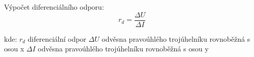   		Výpočet diferenciálního odporu:  		
  		\begin{equation}
  			r_d = \dfrac{\Delta U}{\Delta I}
  		\end{equation}
  		
  		\hspace*{2cm}kde:\newline    
			\hspace*{4cm}$r_d$ \dotfill diferenciální odpor\hspace*{4cm}\newline
			\hspace*{4cm}$\Delta U$ \dotfill odvěsna pravoúhlého trojúhelníku rovnoběžná s osou x\hspace*{4cm}\newline
			\hspace*{4cm}$\Delta I$ \dotfill odvěsna pravoúhlého trojúhelníku rovnoběžná s osou y\hspace*{4cm}\newline
		
 
